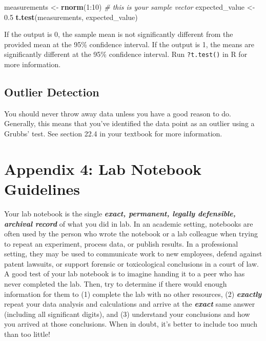 \documentclass[]{tufte-book}
\newenvironment{Shaded}{}{}
\newcommand{\CommentTok}[1]{\textcolor[rgb]{0.38,0.63,0.69}{\textit{#1}}}
\newcommand{\DecValTok}[1]{\textcolor[rgb]{0.25,0.63,0.44}{#1}}
\newcommand{\FloatTok}[1]{\textcolor[rgb]{0.25,0.63,0.44}{#1}}
\newcommand{\KeywordTok}[1]{\textcolor[rgb]{0.00,0.44,0.13}{\textbf{#1}}}
\newcommand{\NormalTok}[1]{#1}
\newcommand{\OperatorTok}[1]{\textcolor[rgb]{0.40,0.40,0.40}{#1}}
\newcommand{\StringTok}[1]{\textcolor[rgb]{0.25,0.44,0.63}{#1}}
\begin{document}
\begin{Shaded}
\begin{Highlighting}[]
\NormalTok{measurements <-}\StringTok{ }\KeywordTok{rnorm}\NormalTok{(}\DecValTok{1}\OperatorTok{:}\DecValTok{10}\NormalTok{)  }\CommentTok{# this is your sample vector}
\NormalTok{expected_value <-}\StringTok{ }\FloatTok{0.5}
\KeywordTok{t.test}\NormalTok{(measurements, expected_value)}
\end{Highlighting}
\end{Shaded}

If the output is 0, the sample mean is not significantly different from the provided mean at the 95\% confidence interval. If the output is 1, the means are significantly different at the 95\% confidence interval. Run \texttt{?t.test()} in R for more information.

\hypertarget{outlier-detection}{%
\section*{Outlier Detection}\label{outlier-detection}}

You should never throw away data unless you have a good reason to do. Generally, this means that you've identified the data point as an outlier using a Grubbs' test. See section 22.4 in your textbook for more information.

\hypertarget{appendix-4-lab-notebook-guidelines}{%
\chapter*{Appendix 4: Lab Notebook Guidelines}\label{appendix-4-lab-notebook-guidelines}}

Your lab notebook is the single \textbf{\emph{exact, permanent, legally defensible, archival record}} of what you did in lab. In an academic setting, notebooks are often used by the person who wrote the notebook or a lab colleague when trying to repeat an experiment, process data, or publish results. In a professional setting, they may be used to communicate work to new employees, defend against patent lawsuits, or support forensic or toxicological conclusions in a court of law. A good test of your lab notebook is to imagine handing it to a peer who has never completed the lab. Then, try to determine if there would enough information for them to (1) complete the lab with no other resources, (2) \textbf{\emph{exactly}} repeat your data analysis and calculations and arrive at the \textbf{\emph{exact}} same answer (including all significant digits), and (3) understand your conclusions and how you arrived at those conclusions. When in doubt, it's better to include too much than too little!
\end{document}
